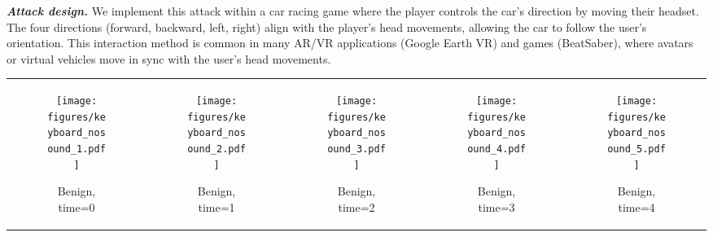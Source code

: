 \noindent \emph{\textbf{Attack design.}} We implement this attack within a car racing game where the player controls the car's direction by moving their headset. The four directions (forward, backward, left, right) align with the player’s head movements, allowing the car to follow the user’s orientation. This interaction method is common in many AR/VR applications (\eg Google Earth VR) and games (\eg BeatSaber), where avatars or virtual vehicles move in sync with the user’s head movements.



\begin{figure*}[h]
    \centering
    \begin{tabular}{ccccc}
        \begin{subfigure}[b]{0.18\textwidth}
            \centering
            \texttt{[image: figures/keyboard\_nosound\_1.pdf]}
            \caption{Benign, time=0}
            \label{subfig:keyboard_nosound_frame1}
        \end{subfigure} &
        \begin{subfigure}[b]{0.18\textwidth}
            \centering
            \texttt{[image: figures/keyboard\_nosound\_2.pdf]}
            \caption{Benign, time=1}
            \label{subfig:keyboard_nosound_frame2}
        \end{subfigure} &
        \begin{subfigure}[b]{0.18\textwidth}
            \centering
            \texttt{[image: figures/keyboard\_nosound\_3.pdf]}
            \caption{Benign, time=2}
            \label{subfig:keyboard_nosound_frame3}
        \end{subfigure} &
        \begin{subfigure}[b]{0.18\textwidth}
            \centering
            \texttt{[image: figures/keyboard\_nosound\_4.pdf]}
            \caption{Benign, time=3}
            \label{subfig:keyboard_nosound_frame4}
        \end{subfigure} &
        \begin{subfigure}[b]{0.18\textwidth}
            \centering
            \texttt{[image: figures/keyboard\_nosound\_5.pdf]}
            \caption{Benign, time=4}
            \label{subfig:keyboard_nosound_frame5}
        \end{subfigure} \\
        

\end{tabular}
\end{figure*}
